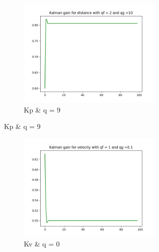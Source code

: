\documentclass{article}
\begin{document}
\begin{figure}[H]
\begin{subfigure}{1\textwidth}
                \begin{subfigure}{.3\textwidth}  
                    \includegraphics[width=1\linewidth]{./img/k11_qf2.png}
                    \caption[font=0.1mm]{Kp \& q = 9 }
                \end{subfigure}
            \end{subfigure}
            \begin{subfigure} {1\textwidth}    
                \begin{subfigure}{.3\textwidth}  
                    \includegraphics[width=1\linewidth]{./img/k22_qf1.png}
                    \caption{Kv \& q = 0 }
                \end{subfigure}
                \begin{subfigure}{.3\textwidth}  

\end{subfigure}
\end{subfigure}
\end{figure}
\end{document}
